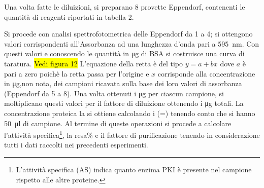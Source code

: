\documentclass[twocolumn,a4paper,10pt]{my_report}
\begin{document}
{Una volta fatte le diluizioni, si preparano 8 provette Eppendorf, contenenti le quantità di reagenti riportati in tabella 2.
\begin{table}[htbp]
\sffamily\scriptsize
\centering

\caption{}
\end{table}

Si procede con analisi spettrofotometrica delle Eppendorf da 1 a 4; si ottengono valori corrispondenti all'Assorbanza ad una lunghezza d'onda pari a \SI{595}{\nm}. Con questi valori e conoscendo le quantità in \si{\ug} di BSA si costruisce una curva di taratura. \hl{Vedi figura 12}
L'equazione della retta è del tipo $y=a+bx$ dove $a$ è pari a zero poichè la retta passa per l'origine e $x$ corrisponde alla concentrazione in \si{\ug},non nota, dei campioni ricavata sulla base dei loro valori di assorbanza (Eppendorf da 5 a 8).
Una volta ottenuti i \si{\ug} per ciascun campione, si moltiplicano questi valori per il fattore di diluizione ottenendo i \si{\ug} totali.
La concentrazione proteica la si ottiene calcolando i \sfrac{\si{\ug}}{\si{\ul}} (=\sfrac{\si{\mg}}{\si{\ml}}) tenendo conto che si hanno \SI{50}{\ul} di campione.
Al termine di queste operazioni si procede a calcolare l'attività specifica\footnote{L'attività specifica (AS) indica quanto enzima PKI è presente nel campione rispetto alle altre proteine.}, la resa\% e il fattore di purificazione tenendo in considerazione tutti i dati raccolti nei precedenti esperimenti.

}
\end{document}
